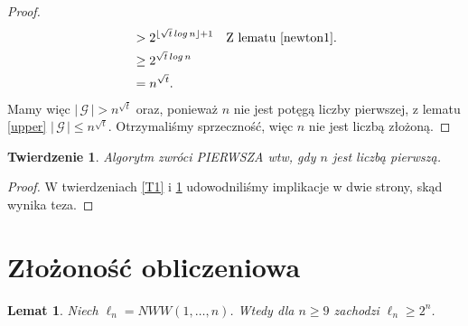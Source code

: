 \documentclass[declaration,shortabstract]{iithesis}
\theoremstyle{definition}
\theoremstyle{remark} \newtheorem{observation}{Obserwacja}
\theoremstyle{plain} \newtheorem{theorem}{Twierdzenie}
\theoremstyle{plain} \newtheorem{lemma}{Lemat}
\theoremstyle{remark} \newtheorem*{remark*}{Uwaga}
\theoremstyle{reminder} \newtheorem*{reminder*}{Przypomnienie}
\begin{document}
\begin{proof}
\begin{align*}
		  & > 2^{\lfloor \sqrt{t}\, log \, n \rfloor + 1}                                               &   & \text{Z lematu \ref{newton1}.}                                                                                                                 \\
		&\geq 2^{\sqrt{t}\,log \,n} \\
		&= n^{\sqrt{t}}.
	\end{align*}
	Mamy więc $| \, \mathcal{G} \, | > n ^{\sqrt{t}}$ oraz, ponieważ $n$ nie jest potęgą liczby pierwszej, z lematu \ref{upper} $| \, \mathcal{G} \, | \leq n^{\sqrt{t}}.$ Otrzymaliśmy sprzeczność, więc $n$ nie jest liczbą złożoną.
\end{proof}
	
\begin{theorem} \label{T2}
	Algorytm zwróci \textit{PIERWSZA} wtw, gdy $n$ jest liczbą pierwszą.
\end{theorem}
	
\begin{proof}
	W twierdzeniach \ref{T1} i \ref{T2} udowodniliśmy implikacje w dwie strony, skąd wynika teza.
\end{proof}
	
\section{Złożoność obliczeniowa}
    
\begin{lemma} \label{3.1}
	Niech $\ell_n = NWW(1, \dots, n)$. Wtedy dla $n \geq 9$ zachodzi $\ell_n \geq 2^n$.
\end{lemma}
	
\end{document}
